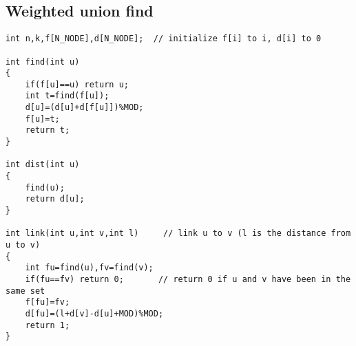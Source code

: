 \documentclass[a4paper,12pt]{article}
\begin{document}
\subsection{Weighted union find}
\begin{lstlisting}
int n,k,f[N_NODE],d[N_NODE];  // initialize f[i] to i, d[i] to 0

int find(int u)
{
    if(f[u]==u) return u;
    int t=find(f[u]);
    d[u]=(d[u]+d[f[u]])%MOD;
    f[u]=t;
    return t;
}

int dist(int u)
{
    find(u);
    return d[u];
}

int link(int u,int v,int l)     // link u to v (l is the distance from u to v)
{
    int fu=find(u),fv=find(v);
    if(fu==fv) return 0;       // return 0 if u and v have been in the same set
    f[fu]=fv;
    d[fu]=(l+d[v]-d[u]+MOD)%MOD;
    return 1;
}
\end{lstlisting}
\end{document}
